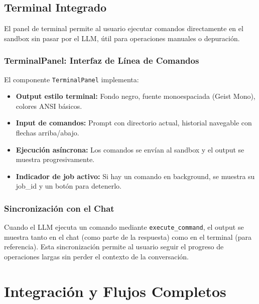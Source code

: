 \subsection{Terminal Integrado}

El panel de terminal permite al usuario ejecutar comandos directamente en el sandbox sin pasar por el LLM, útil para operaciones manuales o depuración.

\subsubsection{TerminalPanel: Interfaz de Línea de Comandos}

El componente \texttt{TerminalPanel} implementa:

\begin{itemize}
    \item \textbf{Output estilo terminal:} Fondo negro, fuente monoespaciada (Geist Mono), colores ANSI básicos.
    \item \textbf{Input de comandos:} Prompt con directorio actual, historial navegable con flechas arriba/abajo.
    \item \textbf{Ejecución asíncrona:} Los comandos se envían al sandbox y el output se muestra progresivamente.
    \item \textbf{Indicador de job activo:} Si hay un comando en background, se muestra su job\_id y un botón para detenerlo.
\end{itemize}

\subsubsection{Sincronización con el Chat}

Cuando el LLM ejecuta un comando mediante \texttt{execute\_command}, el output se muestra tanto en el chat (como parte de la respuesta) como en el terminal (para referencia). Esta sincronización permite al usuario seguir el progreso de operaciones largas sin perder el contexto de la conversación.


\section{Integración y Flujos Completos}
\label{sec:integracion_flujos}

